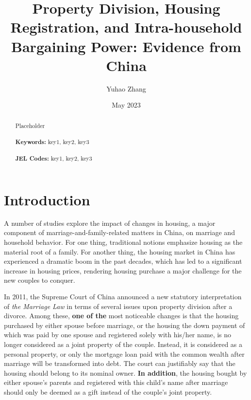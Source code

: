 \documentclass[11pt]{article}
\begin{document}
\begin{titlepage}
\title{\textbf{Property Division, Housing Registration, and Intra-household Bargaining Power: Evidence from China}}
\author{Yuhao Zhang}
\date{May 2023}
\maketitle
\begin{abstract}
\noindent Placeholder\\
\vspace{0in}\\
\noindent\textbf{Keywords:} key1, key2, key3\\
\vspace{0in}\\
\noindent\textbf{JEL Codes:} key1, key2, key3\\

\bigskip
\end{abstract}
\setcounter{page}{0}
\thispagestyle{empty}
\end{titlepage}
\pagebreak \newpage


\section{Introduction} \label{sec:intro}
A number of studies explore the impact of changes in housing, a major component of marriage-and-family-related matters in China, on marriage and household behavior. For one thing, traditional notions emphasize housing as the material root of a family. For another thing, the housing market in China has experienced a dramatic boom in the past decades, which has led to a significant increase in housing prices, rendering housing purchase a major challenge for the new couples to conquer.

In 2011, the Supreme Court of China announced a new statutory interpretation of \textit{the Marriage Law} in terms of several issues upon property division after a divorce. Among these, \textbf{one of the} most noticeable changes is that the housing purchased by either spouse before marriage, or the housing the down payment of which was paid by one spouse and registered solely with his/her name, is no longer considered as a joint property of the couple. Instead, it is considered as a personal property, or only the mortgage loan paid with the common wealth after marriage will be transformed into debt. The court can justifiably say that the housing should belong to its nominal owner. \textbf{In addition}, the housing bought by either spouse's parents and registered with this child's name after marriage should only be deemed as a gift instead of the couple's joint property.
\end{document}
